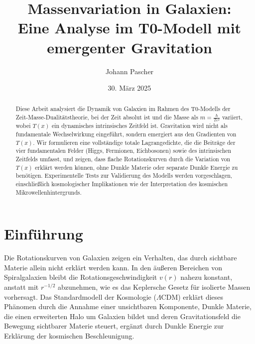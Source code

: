 \documentclass[a4paper,12pt]{article}
\newcommand{\Tfield}{T(x)}
\begin{document}
	
	\title{Massenvariation in Galaxien: \\Eine Analyse im T0-Modell mit emergenter Gravitation}
	\author{Johann Pascher}
	\date{30. März 2025}
	\maketitle
	
	\begin{abstract}
		Diese Arbeit analysiert die Dynamik von Galaxien im Rahmen des T0-Modells der Zeit-Masse-Dualitätstheorie, bei der Zeit absolut ist und die Masse als \( m = \frac{\hbar}{T c^2} \) variiert, wobei \( \Tfield \) ein dynamisches intrinsisches Zeitfeld ist. Gravitation wird nicht als fundamentale Wechselwirkung eingeführt, sondern emergiert aus den Gradienten von \( \Tfield \). Wir formulieren eine vollständige totale Lagrangedichte, die die Beiträge der vier fundamentalen Felder (Higgs, Fermionen, Eichbosonen) sowie des intrinsischen Zeitfelds umfasst, und zeigen, dass flache Rotationskurven durch die Variation von \( \Tfield \) erklärt werden können, ohne Dunkle Materie oder separate Dunkle Energie zu benötigen. Experimentelle Tests zur Validierung des Modells werden vorgeschlagen, einschließlich kosmologischer Implikationen wie der Interpretation des kosmischen Mikrowellenhintergrunds.
	\end{abstract}
	
	\tableofcontents
	\newpage
	
	\section{Einführung}
	
	Die Rotationskurven von Galaxien zeigen ein Verhalten, das durch sichtbare Materie allein nicht erklärt werden kann. In den äußeren Bereichen von Spiralgalaxien bleibt die Rotationsgeschwindigkeit \( v(r) \) nahezu konstant, anstatt mit \( r^{-1/2} \) abzunehmen, wie es das Keplersche Gesetz für isolierte Massen vorhersagt. Das Standardmodell der Kosmologie (\(\Lambda\)CDM) erklärt dieses Phänomen durch die Annahme einer unsichtbaren Komponente, Dunkle Materie, die einen erweiterten Halo um Galaxien bildet und deren Gravitationsfeld die Bewegung sichtbarer Materie steuert, ergänzt durch Dunkle Energie zur Erklärung der kosmischen Beschleunigung.
	
\end{document}
